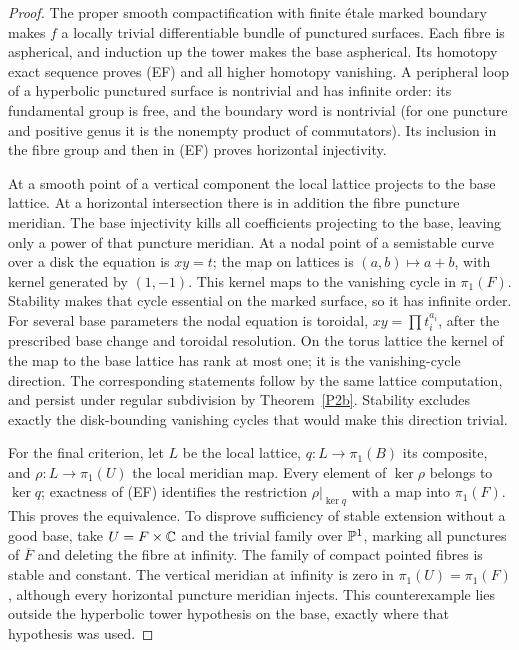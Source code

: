 \begin{proof}
The proper smooth compactification with finite \'etale marked boundary makes
$f$ a locally trivial differentiable bundle of punctured surfaces.  Each fibre
is aspherical, and induction up the tower makes the base aspherical.  Its
homotopy exact sequence proves (EF) and all higher homotopy vanishing.
A peripheral loop of a hyperbolic punctured surface is nontrivial and has
infinite order: its fundamental group is free, and the boundary word is
nontrivial (for one puncture and positive genus it is the nonempty product of
commutators).  Its inclusion in the fibre group and then in (EF) proves
horizontal injectivity.

At a smooth point of a vertical component the local lattice projects to the
base lattice.  At a horizontal intersection there is in addition the fibre
puncture meridian.  The base injectivity kills all coefficients projecting to
the base, leaving only a power of that puncture meridian.
At a nodal point of a semistable curve over a disk the equation is $xy=t$;
the map on lattices is $(a,b)\mapsto a+b$, with kernel generated by $(1,-1)$.
This kernel maps to the vanishing cycle in $\pi_1(F)$.  Stability makes that
cycle essential on the marked surface, so it has infinite order.
For several base parameters the nodal equation is toroidal,
$xy=\prod t_i^{a_i}$, after the prescribed base change and toroidal resolution.
On the torus lattice the kernel of the map to the base lattice has rank at
most one; it is the vanishing-cycle direction.  The corresponding statements
follow by the same lattice computation, and persist under regular
subdivision by Theorem~\ref{P2b}.  Stability excludes exactly the disk-bounding
vanishing cycles that would make this direction trivial.

For the final criterion, let $L$ be the local lattice, $q:L\to\pi_1(B)$ its
composite, and $\rho:L\to\pi_1(U)$ the local meridian map.  Every element of
$\ker\rho$ belongs to $\ker q$; exactness of (EF) identifies the restriction
$\rho|_{\ker q}$ with a map into $\pi_1(F)$.  This proves the equivalence.
To disprove sufficiency of stable extension without a good base, take
$U=F\times\mathbb C$ and the trivial family over $\mathbb P^1$, marking all punctures of
$\overline F$ and deleting the fibre at infinity.  The family of compact
pointed fibres is stable and constant.  The vertical meridian at infinity is
zero in $\pi_1(U)=\pi_1(F)$, although every horizontal puncture meridian
injects.  This counterexample lies outside the hyperbolic tower hypothesis
on the base, exactly where that hypothesis was used.
\end{proof}

